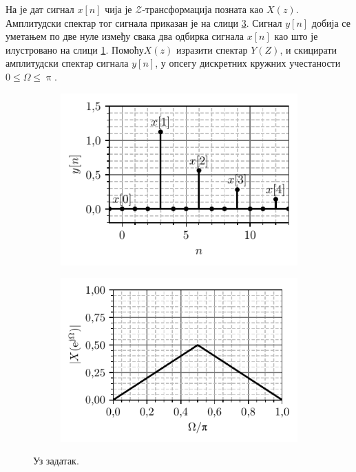 \PID На је дат сигнал $x[n]$ чија је $\mathcal{Z}$-трансформација позната као $X(z)$. Амплитудски 
спектар тог сигнала приказан је на слици \ref{\ID.um.jw}. Сигнал $y[n]$ добија се уметањем по 
две нуле између свака два одбирка сигнала $x[n]$ као што је илустровано на слици \ref{\ID.um.x}.
Помоћу$X(z)$ изразити спектар $Y(Z)$, и скицирати амплитудски спектар сигнала $y[n]$, у опсегу
дискретних кружних учестаности $0 \leq \Omega \leq \uppi$.

%
\begin{figure}[ht!]
    \centering
    \begin{subfigure}{0.49\textwidth}
        \includegraphics{fig/umetanje_def.pdf}
        \caption{}
        \label{\ID.um.x}    
    \end{subfigure}
    \begin{subfigure}{0.49\textwidth}
        \includegraphics{fig/umetanje_x_jw.pdf}
        \caption{}
        \label{\ID.um.jw}    
    \end{subfigure}
    \caption{Уз задатак.}
\end{figure}
